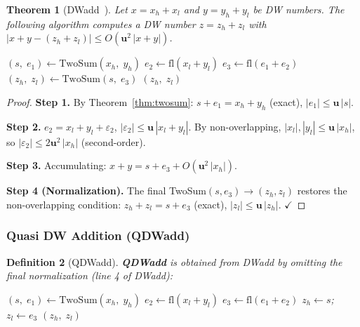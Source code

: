 \documentclass[12pt,a4paper]{article}
\newtheorem{theorem}{Theorem}[section]
\newtheorem{definition}[theorem]{Definition}
\newcommand{\fl}{\mathrm{fl}}
\newcommand{\uu}{\mathbf{u}}
\begin{document}
\begin{theorem}[DWadd~\cite{Joldes2017}]
Let $x = x_h + x_l$ and $y = y_h + y_l$ be DW numbers.
The following algorithm computes a DW number $z = z_h + z_l$ with
$|x + y - (z_h + z_l)| \leq O(\uu^2\,|x + y|)$.

\begin{algorithm}[H]
\caption{$\mathrm{DWadd}(x_h, x_l,\; y_h, y_l) \to (z_h,\, z_l)$}
\begin{algorithmic}[1]
\State $(s,\; e_1) \leftarrow \mathrm{TwoSum}(x_h,\; y_h)$
\State $e_2 \leftarrow \fl(x_l + y_l)$
\State $e_3 \leftarrow \fl(e_1 + e_2)$
\State $(z_h,\; z_l) \leftarrow \mathrm{TwoSum}(s,\; e_3)$
\State \Return $(z_h,\; z_l)$
\end{algorithmic}
\end{algorithm}
\end{theorem}

\begin{proof}
\textbf{Step 1.}
By Theorem~\ref{thm:twosum}: $s + e_1 = x_h + y_h$ (exact), $|e_1| \leq \uu\,|s|$.

\textbf{Step 2.}
$e_2 = x_l + y_l + \varepsilon_2$, $|\varepsilon_2| \leq \uu\,|x_l + y_l|$.
By non-overlapping, $|x_l|, |y_l| \leq \uu\,|x_h|$, so $|\varepsilon_2| \leq 2\uu^2\,|x_h|$ (second-order).

\textbf{Step 3.}
Accumulating: $x + y = s + e_3 + O(\uu^2\,|x_h|)$.

\textbf{Step 4 (Normalization).}
The final TwoSum$(s, e_3) \to (z_h, z_l)$ restores the non-overlapping condition:
$z_h + z_l = s + e_3$ (exact), $|z_l| \leq \uu\,|z_h|$. \qquad $\checkmark$
\end{proof}

\subsubsection{Quasi DW Addition (QDWadd)}

\begin{definition}[QDWadd]
\textbf{QDWadd} is obtained from DWadd by \emph{omitting the final normalization}
(line 4 of DWadd):

\begin{algorithm}[H]
\caption{$\mathrm{QDWadd}(x_h, x_l,\; y_h, y_l) \to (z_h,\, z_l)$}
\begin{algorithmic}[1]
\State $(s,\; e_1) \leftarrow \mathrm{TwoSum}(x_h,\; y_h)$
\State $e_2 \leftarrow \fl(x_l + y_l)$
\State $e_3 \leftarrow \fl(e_1 + e_2)$
\State $z_h \leftarrow s$;\quad $z_l \leftarrow e_3$
\State \Return $(z_h,\; z_l)$
\end{algorithmic}
\end{algorithm}
\end{definition}
\end{document}
